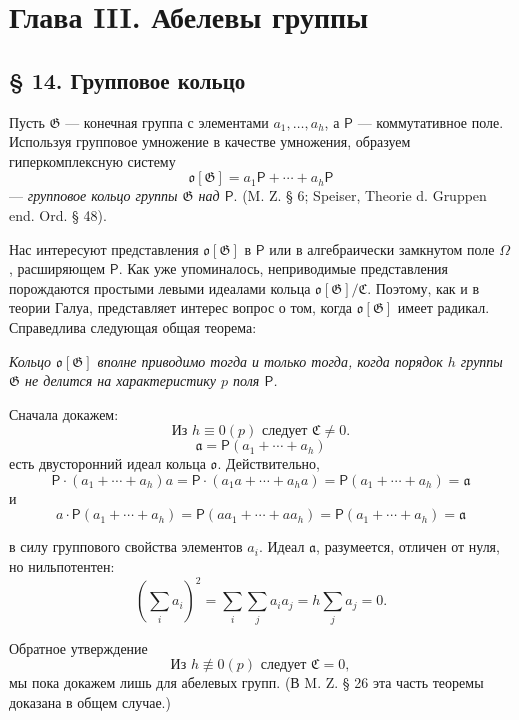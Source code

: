 \documentclass[11pt]{article}
\begin{document}
\section*{Глава III. Абелевы группы}\label{kapitel-iii.-abelsche-gruppen}

\subsection*{§ 14. Групповое кольцо}\label{der-gruppenring}

Пусть \(\mathfrak G\) --- конечная группа с элементами \(a_1,\ldots,a_h\), а \(\mathsf P\) --- коммутативное поле. Используя групповое умножение в качестве умножения, образуем гиперкомплексную систему
\[
\mathfrak o[\mathfrak G]=a_1\mathsf P+\cdots+a_h\mathsf P
\]
--- \emph{групповое кольцо группы \(\mathfrak G\) над \(\mathsf P\)}. (M. Z. § 6; Speiser, Theorie d. Gruppen end. Ord. § 48).

Нас интересуют представления \(\mathfrak o[\mathfrak G]\) в \(\mathsf P\) или в алгебраически замкнутом поле \(\Omega\), расширяющем \(\mathsf P\). Как уже упоминалось, неприводимые представления порождаются простыми левыми идеалами кольца \(\mathfrak o[\mathfrak G]/\mathfrak C\). Поэтому, как и в теории Галуа, представляет интерес вопрос о том, когда \(\mathfrak o[\mathfrak G]\) имеет радикал. Справедлива следующая общая теорема:

\begin{center}
\emph{Кольцо \(\mathfrak o[\mathfrak G]\) вполне приводимо тогда и только тогда, когда порядок \(h\) группы \(\mathfrak G\) не делится на характеристику \(p\) поля \(\mathsf P\).}
\end{center}

Сначала докажем:
\[
\text{Из } h\equiv0(p) \text{ следует } \mathfrak C\ne 0.
\]
\[
\mathfrak a=\mathsf P(a_1+\cdots+a_h)
\]
есть двусторонний идеал кольца \(\mathfrak o\). Действительно,
\[
\mathsf P\cdot(a_1+\cdots+a_h)a
=\mathsf P\cdot(a_1a+\cdots+a_ha)
=\mathsf P(a_1+\cdots+a_h)=\mathfrak a
\]
и
\[
a\cdot\mathsf P(a_1+\cdots+a_h)
=\mathsf P(aa_1+\cdots+aa_h)
=\mathsf P(a_1+\cdots+a_h)=\mathfrak a
\]

в силу группового свойства элементов \(a_i\). Идеал \(\mathfrak a\), разумеется, отличен от нуля, но нильпотентен:
\[
\left(\sum_i a_i\right)^2=\sum_i\sum_j a_i a_j
=h\sum_j a_j=0.
\]

Обратное утверждение
\[
\text{Из } h\not\equiv0(p) \text{ следует } \mathfrak C=0,
\]
мы пока докажем лишь для абелевых групп. (В M. Z. § 26 эта часть теоремы доказана в общем случае.)
\end{document}
